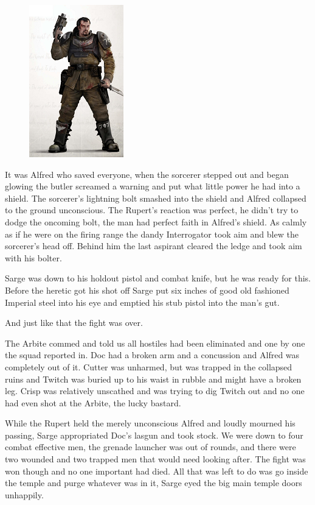 \begin{figure}
	\begin{center}
		\includegraphics[width=\figwidth]{pics/6/45.png}
	\end{center}
\end{figure}
It was Alfred who saved everyone, when the sorcerer stepped out and began glowing the butler screamed a warning and put what little power he had into a shield. 
The sorcerer's lightning bolt smashed into the shield and Alfred collapsed to the ground unconscious. 
The Rupert's reaction was perfect, he didn't try to dodge the oncoming bolt, the man had perfect faith in Alfred's shield. 
As calmly as if he were on the firing range the dandy Interrogator took aim and blew the sorcerer's head off. 
Behind him the last aspirant cleared the ledge and took aim with his bolter.

Sarge was down to his holdout pistol and combat knife, but he was ready for this. 
Before the heretic got his shot off Sarge put six inches of good old fashioned Imperial steel into his eye and emptied his stub pistol into the man's gut.

And just like that the fight was over. 

The Arbite commed and told us all hostiles had been eliminated and one by one the squad reported in. 
Doc had a broken arm and a concussion and Alfred was completely out of it. 
Cutter was unharmed, but was trapped in the collapsed ruins and Twitch was buried up to his waist in rubble and might have a broken leg. 
Crisp was relatively unscathed and was trying to dig Twitch out and no one had even shot at the Arbite, the lucky bastard.

While the Rupert held the merely unconscious Alfred and loudly mourned his passing, Sarge appropriated Doc's lasgun and took stock. 
We were down to four combat effective men, the grenade launcher was out of rounds, and there were two wounded and two trapped men that would need looking after. 
The fight was won though and no one important had died. 
All that was left to do was go inside the temple and purge whatever was in it, Sarge eyed the big main temple doors unhappily.

